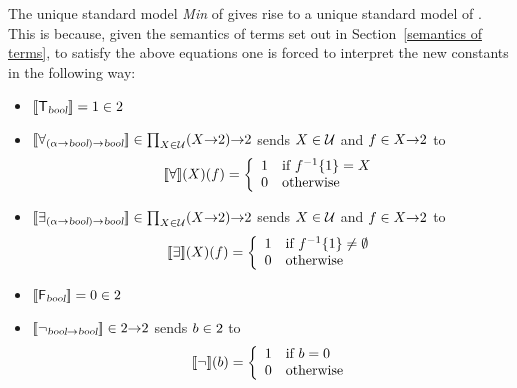 The unique standard model {\em Min\/} of  gives rise to a
unique standard model of
. This is
because, given the semantics of terms set out in
Section~\ref{semantics of terms}, to satisfy the above equations one
is forced to interpret the new constants in the following way:
\begin{itemize}

\item $\den{\T_{\bool}}\index{T@\ml{T}!formal semantics of} = 1 \in \two$

\item {}
$[\![\forall_{(\alpha{\to}\textsl{bool}){\to}\textsl{bool}}]\!]\in\prod_{X\in{\cal
 U}}(X{\to}\mbox{\rm 2}){\to}\mbox{\rm 2}$ sends $X\in{\cal U}$ and $f\in X{\to}\mbox{\rm 2}$ to
\[
[\![\forall]\!](X)(f) = \left\{ \begin{array}{ll} 1 & \mbox{if
$f^{-1}\{1\}=X$} \\ 0 & \mbox{otherwise} \end{array} \right.
\]

\item {}
$[\![\exists_{(\alpha{\to}\textsl{bool}){\to}\textsl{bool}}]\!]\in\prod_{X\in{\cal
 U}}(X{\to}\mbox{\rm 2}){\to}\mbox{\rm 2}$ sends $X\in{\cal U}$ and $f\in X{\to}\mbox{\rm 2}$ to
\[
[\![\exists]\!](X)(f) = \left\{ \begin{array}{ll}
                                   1 & \mbox{if $f^{-1}\{1\}\not=\emptyset$} \\
                                   0 & \mbox{otherwise}
                                  \end{array}
                          \right. \]

\item $[\![{\sf F}_{\textsl{bool}}]\!] = 0 \in \mbox{\rm 2}$

\item $[\![\neg_{\textsl{bool}{\to}\textsl{bool}}]\!]\in\mbox{\rm 2}{\to}\mbox{\rm 2}$ sends $b\in\mbox{\rm 2}$ to
 \[ [\![\neg]\!](b) = \left\{ \begin{array}{ll}
                             1 & \mbox{if $b=0$} \\
                             0 & \mbox{otherwise}
                            \end{array}
                    \right. \]


\end{itemize}
